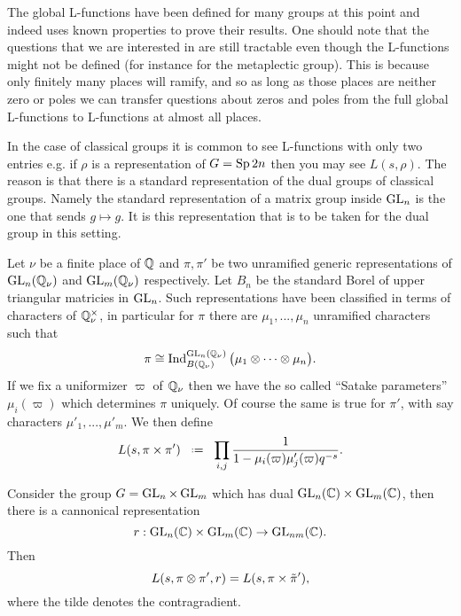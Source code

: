 \begin{remark}
    The global L-functions have been defined for many groups at this point and indeed \cite{jiangPolesCertainResidual2013} uses known properties to prove their results. One should note that the questions that we are interested in are still tractable even though the L-functions might not be defined (for instance for the metaplectic group). This is because only finitely many places will ramify, and so as long as those places are neither zero or poles we can transfer questions about zeros and poles from the full global L-functions to L-functions at almost all places. 
\end{remark}

\begin{example}
    In the case of classical groups it is common to see L-functions with only two entries e.g. if \(\rho\) is a representation of \(G = \operatorname{Sp}{2n}\) then you may see 
    \(L(s, \rho).\)
    The reason is that there is a standard representation of the dual groups of classical groups. Namely the standard representation of a matrix group inside \(\operatorname{GL}_n\) is the one that sends \(g\mapsto g\). It is this representation that is to be taken for the dual group in this setting.
\end{example}

\begin{example}
    Let \(\nu\) be a finite place of \(\Q\) and \(\pi, \pi'\) be two unramified generic representations of \(\GL_n(\Q_\nu)\) and \(\GL_m(\Q_\nu)\) respectively. Let \(B_n\) be the standard Borel of upper triangular matricies in \(\operatorname{GL}_n\). Such representations have been classified 
    in terms of characters of \(\Q^\times_\nu\), in particular for \(\pi\) there are \(\mu_1, ..., \mu_n\) unramified characters such that 
    \[\pi \cong \Ind_{B(\Q_\nu)}^{\GL_n(\Q_\nu)} \big(\mu_1 \tensor \cdots \tensor \mu_n\big).\]
    If we fix a uniformizer \(\varpi\) of \(\Q_\nu\) then we have the so called ``Satake parameters'' \(\mu_i(\varpi)\) which determines \(\pi\) uniquely. Of course the same is true for \(\pi'\), with say characters \(\mu'_1, ..., \mu'_m\). We then define
    \[L(s, \pi\times \pi') \defeq \prod_{i,j} \frac{1}{1-\mu_i(\varpi)\mu'_j(\varpi)q^{-s}}.\]

    Consider the group \(G = \operatorname{GL}_n\times \operatorname{GL}_m\) which has dual \(\GL_n(\C) \times \GL_m(\C)\), then there is a cannonical representation 
    \[r:\GL_n(\C) \times \GL_m(\C) \to \GL_{nm}(\C). \]
    Then 
    \[L(s, \pi\otimes \pi', r) = L(s, \pi \times \tilde{\pi}'),\]
    where the tilde denotes the contragradient.
\end{example}

